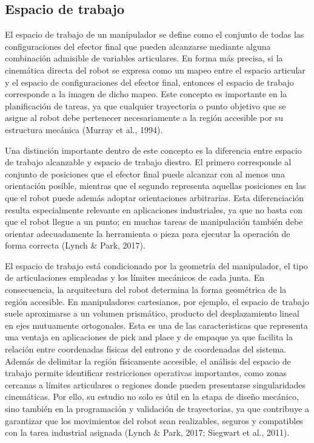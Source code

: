 \subsection{Espacio de trabajo}
El espacio de trabajo de un manipulador se define como el conjunto de todas las configuraciones del efector final que pueden alcanzarse mediante alguna combinación admisible de variables articulares. En forma más precisa, si la cinemática directa del robot se expresa como un mapeo entre el espacio articular y el espacio de configuraciones del efector final, entonces el espacio de trabajo corresponde a la imagen de dicho mapeo. Este concepto es importante en la planificación de tareas, ya que cualquier trayectoria o punto objetivo que se asigne al robot debe pertenecer necesariamente a la región accesible por su estructura mecánica (Murray et al., 1994).

Una distinción importante dentro de este concepto es la diferencia entre espacio de trabajo alcanzable y espacio de trabajo diestro. El primero corresponde al conjunto de posiciones que el efector final puede alcanzar con al menos una orientación posible, mientras que el segundo representa aquellas posiciones en las que el robot puede además adoptar orientaciones arbitrarias. Esta diferenciación resulta especialmente relevante en aplicaciones industriales, ya que no basta con que el robot llegue a un punto; en muchas tareas de manipulación también debe orientar adecuadamente la herramienta o pieza para ejecutar la operación de forma correcta (Lynch \& Park, 2017).

El espacio de trabajo está condicionado por la geometría del manipulador, el tipo de articulaciones empleadas y los límites mecánicos de cada junta. En consecuencia, la arquitectura del robot determina la forma geométrica de la región accesible. En manipuladores cartesianos, por ejemplo, el espacio de trabajo suele aproximarse a un volumen prismático, producto del desplazamiento lineal en ejes mutuamente ortogonales. Esta es una de las caracteristicas que representa una ventaja en aplicaciones de pick and place y de empaque ya que facilita la relación entre coordenadas físicas del entrono y de coordenadas del sistema. Además de delimitar la región físicamente accesible, el análisis del espacio de trabajo permite identificar restricciones operativas importantes, como zonas cercanas a límites articulares o regiones donde pueden presentarse singularidades cinemáticas. Por ello, su estudio no solo es útil en la etapa de diseño mecánico, sino también en la programación y validación de trayectorias, ya que contribuye a garantizar que los movimientos del robot sean realizables, seguros y compatibles con la tarea industrial asignada (Lynch \& Park, 2017; Siegwart et al., 2011).

